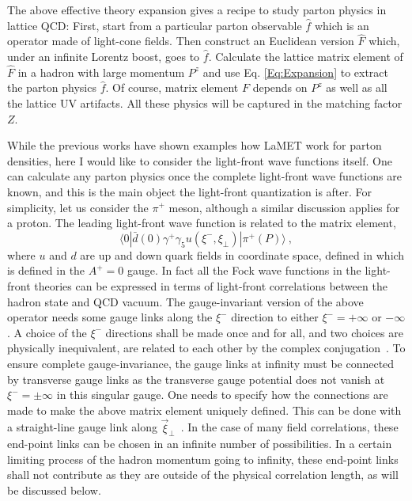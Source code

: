 The above effective theory expansion gives a recipe to study parton physics in lattice QCD:
First, start from a particular parton observable $\hat f$ which is an operator made of
light-cone fields. Then construct an
Euclidean version $\hat F$ which, under an infinite Lorentz boost, goes to $\hat f$. Calculate the lattice matrix element
of $\hat F$ in a hadron with large momentum $P^z$ and use Eq. \ref{Eq:Expansion} to extract the parton physics $\hat f$.
Of course, matrix element $F$ depends on $P^z$ as well as all the lattice UV artifacts. All these physics will be
captured in the matching factor $Z$.

While the previous works have shown examples how LaMET work for parton densities, here I would like to
consider the light-front wave functions itself. One can calculate any parton physics once the complete
light-front wave functions are known, and this is the main object the light-front quantization is after.
For simplicity, let us consider the $\pi^+$ meson, although a similar discussion applies for a proton.
The leading light-front wave function is related to the matrix element,
\begin{equation}
  \langle 0|\bar d(0)\gamma^+\gamma_5 u(\xi^-,\xi_\perp)|\pi^+(P)\rangle \ ,
\label{Eq:meson}
\end{equation}
where $u$ and $d$ are up and down quark fields in coordinate space, defined in
which is defined in the $A^+=0$ gauge. In fact all the Fock wave functions in the light-front theories
can be expressed in terms of light-front correlations between the hadron state and QCD vacuum.
The gauge-invariant version of the above operator
needs some gauge links along the $\xi^-$ direction to either $\xi^- =+\infty$ or $-\infty$.
A choice of the $\xi^-$ directions shall be made once and for all, and two choices are
physically inequivalent, are related to each other by the complex conjugation~\cite{Ji:2002xn,Ji:2003yj}.
To ensure complete gauge-invariance, the gauge links at infinity must be connected
by transverse gauge links as the transverse gauge potential does not vanish at $\xi^-=\pm \infty$ in this
singular gauge. One needs to specify how the connections are made to make
the above matrix element uniquely defined. This can be done with a straight-line gauge link
along $\vec{\xi}_\perp$~\cite{Ji:2002aa}. In the case of many field correlations,
these end-point links can be chosen in an infinite number of possibilities.
In a certain limiting process of the hadron momentum
going to infinity, these end-point links shall not contribute as they are outside of the
physical correlation length, as will be discussed below.

